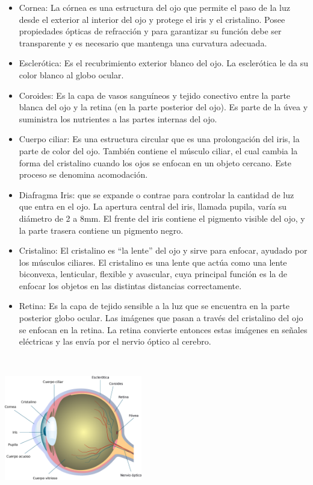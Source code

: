\begin{itemize}
\item Cornea: La córnea es una estructura del ojo que permite el paso de la luz
desde el exterior al interior del ojo y protege el iris y el cristalino. Posee
propiedades ópticas de refracción y para garantizar su función debe ser transparente
y es necesario que mantenga una curvatura adecuada.
\item Esclerótica: Es el recubrimiento exterior blanco del ojo. La esclerótica le da
su color blanco al globo ocular.
\item Coroides: Es la capa de vasos sanguíneos y tejido conectivo entre la parte blanca del ojo y la retina (en la parte posterior del ojo). Es parte de la úvea y suministra los nutrientes a las partes internas del ojo.
\item Cuerpo ciliar: Es una estructura circular que es una prolongación del iris, la
parte de color del ojo. También contiene el músculo ciliar, el cual cambia la forma
del cristalino cuando los ojos se enfocan en un objeto cercano. Este proceso se
denomina acomodación.
\item Diafragma Iris: que se expande o contrae para controlar la cantidad de luz que
entra en el ojo. La apertura central del iris, llamada pupila, varía su diámetro de 2
a 8mm. El frente del iris contiene el pigmento visible del ojo, y la parte trasera
contiene un pigmento negro.
\item Cristalino: El cristalino es “la lente” del ojo y sirve para enfocar, ayudado
por los músculos ciliares. El cristalino es una lente que actúa como una lente
biconvexa, lenticular, flexible y avascular, cuya principal función es la de enfocar
los objetos en las distintas distancias correctamente.
\item Retina: Es la capa de tejido sensible a la luz que se encuentra en la parte
posterior globo ocular. Las imágenes que pasan a través del cristalino del ojo se
enfocan en la retina. La retina convierte entonces estas imágenes en señales eléctricas
y las envía por el nervio óptico al cerebro.
\end{itemize}
~\cite{joseramon2005}
\begin{center}
    \includegraphics[width=0.45\textwidth]{Capitulo2/Fig1_2.eps}
    \label{Fig1_2}
\end{center}

